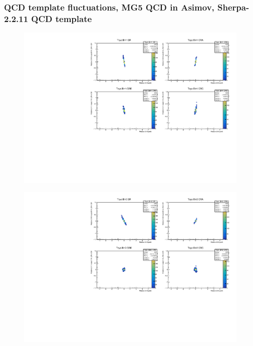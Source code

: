 \subsubsection{\mjj QCD template fluctuations, MG5 QCD in Asimov, Sherpa-2.2.11 QCD template}
\begin{figure}[H]
\includegraphics[width=\textwidth]{plots/diffx/instab/constfx/instabilities_mjj_QCD_Sh2211_Signal_Sh2211_BSMCQCDSTATS_madgraphasimov_bin1.pdf}
\end{figure}
\begin{figure}[H]
\includegraphics[width=\textwidth]{plots/diffx/instab/constfx/instabilities_mjj_QCD_Sh2211_Signal_Sh2211_BSMCQCDSTATS_madgraphasimov_bin2.pdf}
\end{figure}
